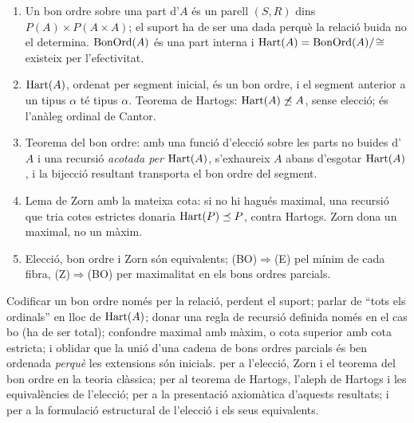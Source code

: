 \begin{resumcap}
\begin{enumerate}
  \item Un bon ordre sobre una part d'\(A\) és un parell \((S,R)\) dins \(P(A)\times P(A\times A)\); el suport ha de ser una dada perquè la relació buida no el determina. \(\operatorname{BonOrd}(A)\) és una part interna i \(\operatorname{Hart}(A)=\operatorname{BonOrd}(A)/\!\cong\) existeix per l'efectivitat.
  \item \(\operatorname{Hart}(A)\), ordenat per segment inicial, és un bon ordre, i el segment anterior a un tipus \(\alpha\) té tipus \(\alpha\). Teorema de Hartogs: \(\operatorname{Hart}(A)\not\preceq A\), sense elecció; és l'anàleg ordinal de Cantor.
  \item Teorema del bon ordre: amb una funció d'elecció sobre les parts no buides d'\(A\) i una recursió \emph{acotada per \(\operatorname{Hart}(A)\)}, s'exhaureix \(A\) abans d'esgotar \(\operatorname{Hart}(A)\), i la bijecció resultant transporta el bon ordre del segment.
  \item Lema de Zorn amb la mateixa cota: si no hi hagués maximal, una recursió que tria cotes estrictes donaria \(\operatorname{Hart}(P)\preceq P\), contra Hartogs. Zorn dona un maximal, no un màxim.
  \item Elecció, bon ordre i Zorn són equivalents; (BO)\(\Rightarrow\)(E) pel mínim de cada fibra, (Z)\(\Rightarrow\)(BO) per maximalitat en els bons ordres parcials.
\end{enumerate}
 Codificar un bon ordre només per la relació, perdent el suport; parlar de \enquote{tots els ordinals} en lloc de \(\operatorname{Hart}(A)\); donar una regla de recursió definida només en el cas bo (ha de ser total); confondre maximal amb màxim, o cota superior amb cota estricta; i oblidar que la unió d'una cadena de bons ordres parcials és ben ordenada \emph{perquè} les extensions són inicials.
 \cite[§§15--17]{halmos} per a l'elecció, Zorn i el teorema del bon ordre en la teoria clàssica; \cite[cap.~5]{jech2003} per al teorema de Hartogs, l'aleph de Hartogs i les equivalències de l'elecció; \cite[cap.~I.12]{kunen2011} per a la presentació axiomàtica d'aquests resultats; i \cite[apèndix~B]{lawvere-rosebrugh} per a la formulació estructural de l'elecció i els seus equivalents.
\end{resumcap}
